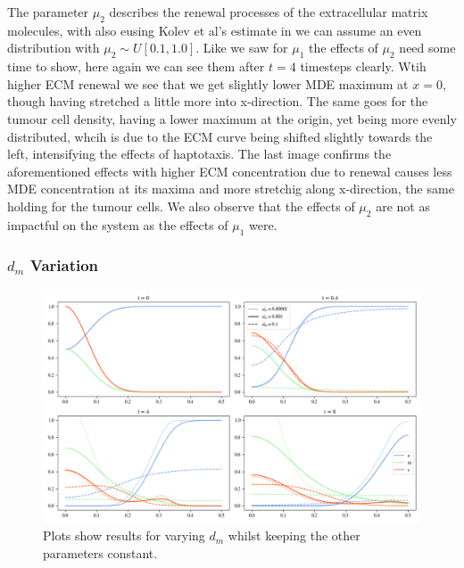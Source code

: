 The parameter $\mu_2$ describes the renewal processes of the extracellular matrix molecules, with also eusing Kolev et al's estimate in \cite{Kolev2010} we can assume an even distribution with $\mu_2 \sim U[0.1, 1.0]$.\newline 
Like we saw for $\mu_1$ the effects of $\mu_2$ need some time to show, here again we can see them after $t=4$ timesteps clearly. Wtih higher ECM renewal we see that we get slightly lower MDE maximum at $x=0$, though having stretched a little more into x-direction. The same goes for the tumour cell density, having a lower maximum at the origin, yet being more evenly distributed, whcih is due to the ECM curve being shifted slightly towards the left, intensifying the effects of haptotaxis. The last image confirms the aforementioned effects with higher ECM concentration due to renewal causes less MDE concentration at its maxima and more stretchig along x-direction, the same holding for the tumour cells. We also observe that the effects of $\mu_2$ are not as impactful on the system as the effects of $\mu_1$ were.

\subsubsection*{$d_m$ Variation}
\begin{figure}[h]
    \centering
    \includegraphics[width=\textwidth]{resources/images/prolif_dm_variation.png}
    \caption{Plots show results for varying $d_m$ whilst keeping the other parameters constant.}
    \label{fig:prolif_dm_variation}
\end{figure}

